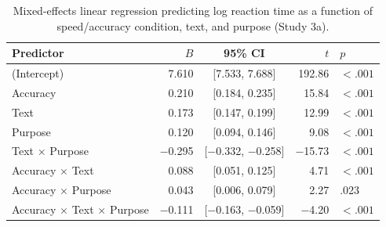 \documentclass[pdflatex,sn-nature]{sn-jnl}
\begin{document}
\begin{appendices}
\begin{table}[htbp]
\caption{Mixed-effects linear regression predicting log reaction time as a function of speed/accuracy condition, text, and purpose (Study 3a).}
\label{tab:S8}
\begin{tabular*}{\textwidth}{@{\extracolsep{\fill}}lrcrl@{}}
\toprule
Predictor & $B$ & 95\% CI & $t$ & $p$ \\
\midrule
(Intercept)                              & 7.610 & [7.533, 7.688] & 192.86  & $<.001$ \\
Accuracy                                 & 0.210 & [0.184, 0.235] & 15.84   & $<.001$ \\
Text                                     & 0.173 & [0.147, 0.199] & 12.99   & $<.001$ \\
Purpose                                  & 0.120 & [0.094, 0.146] & 9.08    & $<.001$ \\
Text $\times$ Purpose                    & $-$0.295 & [$-$0.332, $-$0.258] & $-$15.73 & $<.001$ \\
Accuracy $\times$ Text                   & 0.088 & [0.051, 0.125] & 4.71    & $<.001$ \\
Accuracy $\times$ Purpose                & 0.043 & [0.006, 0.079] & 2.27    & .023    \\
Accuracy $\times$ Text $\times$ Purpose  & $-$0.111 & [$-$0.163, $-$0.059] & $-$4.20 & $<.001$ \\
\bottomrule
\end{tabular*}
\end{table}


\end{appendices}
\end{document}

